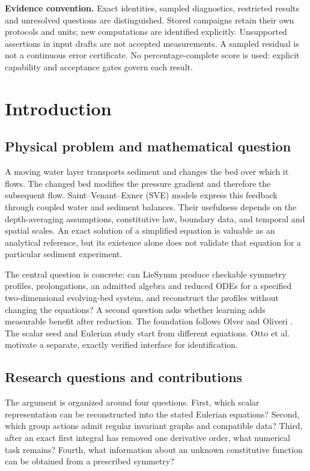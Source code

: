 \documentclass[11pt,a4paper,oneside]{report}
\numberwithin{equation}{chapter}
\begin{document}
\textbf{Evidence convention.} Exact identities, sampled diagnostics, restricted results and unresolved questions are distinguished. Stored campaigns retain their own protocols and units; new computations are identified explicitly. Unsupported assertions in input drafts are not accepted measurements. A sampled residual is not a continuous error certificate. No percentage-complete score is used: explicit capability and acceptance gates govern each result.
\tableofcontents
\clearpage{}

\chapter{Introduction}\label{ch:intro}
\section{Physical problem and mathematical question}
A moving water layer transports sediment and changes the bed over which it flows. The changed bed modifies the pressure gradient and therefore the subsequent flow. Saint--Venant--Exner (SVE) models express this feedback through coupled water and sediment balances. Their usefulness depends on the depth-averaging assumptions, constitutive law, boundary data, and temporal and spatial scales. An exact solution of a simplified equation is valuable as an analytical reference, but its existence alone does not validate that equation for a particular sediment experiment.

The central question is concrete: can LieSymm produce checkable symmetry profiles, prolongations, an admitted algebra and reduced ODEs for a specified two-dimensional evolving-bed system, and reconstruct the profiles without changing the equations? A second question asks whether learning adds measurable benefit after reduction. The foundation follows Olver \cite{olver,olver1986} and Oliveri \cite{oliveri2026}. The scalar seed \cite{ap} and Eulerian study \cite{sve2022} start from different equations. Otto et al.\ \cite{otto} motivate a separate, exactly verified interface for identification.

\section{Research questions and contributions}
The argument is organized around four questions. First, which scalar representation can be reconstructed into the stated Eulerian equations? Second, which group actions admit regular invariant graphs and compatible data? Third, after an exact first integral has removed one derivative order, what numerical task remains? Fourth, what information about an unknown constitutive function can be obtained from a prescribed symmetry?
\end{document}
